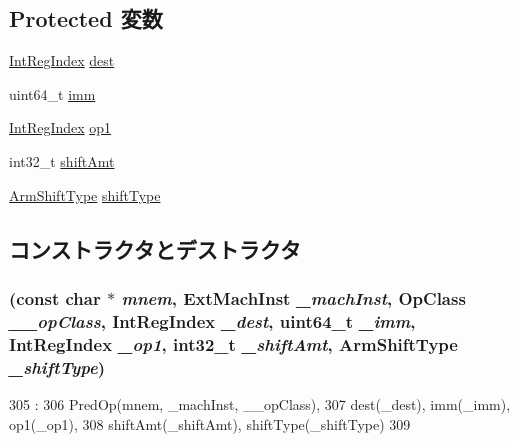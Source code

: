 \subsection*{Protected 変数}
\begin{DoxyCompactItemize}
\item 
\hyperlink{namespaceArmISA_ae64680ba9fb526106829d6bf92fc791b}{IntRegIndex} \hyperlink{classRegImmRegShiftOp_aec72e8e45bdc87abeeeb75d2a8a9a716}{dest}
\item 
uint64\_\-t \hyperlink{classRegImmRegShiftOp_a2b4406ad2843b5aa12d244d01d8fdc69}{imm}
\item 
\hyperlink{namespaceArmISA_ae64680ba9fb526106829d6bf92fc791b}{IntRegIndex} \hyperlink{classRegImmRegShiftOp_a4c465c43ad568f8bcf8ae71480e9cfea}{op1}
\item 
int32\_\-t \hyperlink{classRegImmRegShiftOp_a378dfadeb317c390962c147be928d92d}{shiftAmt}
\item 
\hyperlink{namespaceArmISA_a209d79feaaef0aa2f54ae62e53ee90de}{ArmShiftType} \hyperlink{classRegImmRegShiftOp_ae5b7df4bd366c5419743bf5f679485b9}{shiftType}
\end{DoxyCompactItemize}


\subsection{コンストラクタとデストラクタ}
\hypertarget{classRegImmRegShiftOp_a6ac5b901d95dfce68c0666393d0c0a6e}{
\subsubsection[{RegImmRegShiftOp}]{ (const char $\ast$ {\em mnem}, \/  {\bf ExtMachInst} {\em \_\-machInst}, \/  OpClass {\em \_\-\_\-opClass}, \/  {\bf IntRegIndex} {\em \_\-dest}, \/  uint64\_\-t {\em \_\-imm}, \/  {\bf IntRegIndex} {\em \_\-op1}, \/  int32\_\-t {\em \_\-shiftAmt}, \/  {\bf ArmShiftType} {\em \_\-shiftType})}}
\label{classRegImmRegShiftOp_a6ac5b901d95dfce68c0666393d0c0a6e}



\begin{DoxyCode}
305                                                                  :
306         PredOp(mnem, _machInst, __opClass),
307         dest(_dest), imm(_imm), op1(_op1),
308         shiftAmt(_shiftAmt), shiftType(_shiftType)
309     {}

\end{DoxyCode}


